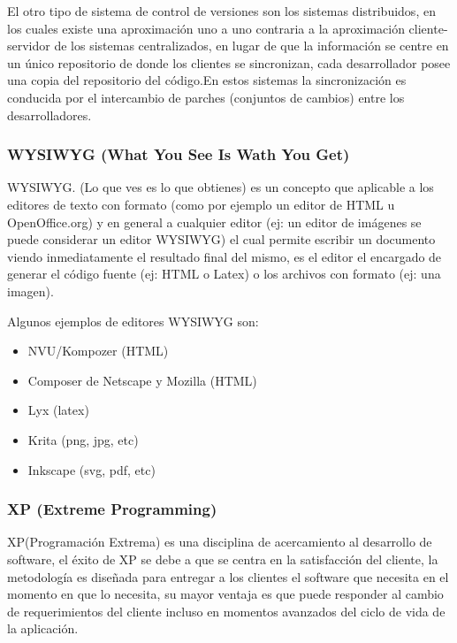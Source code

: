 El otro tipo de sistema de control de versiones son los sistemas distribuidos, en los cuales existe una aproximación uno a uno contraria a la aproximación cliente-servidor de los sistemas centralizados, en lugar de que la información se centre en un único repositorio de donde los clientes se sincronizan, cada desarrollador posee una copia del repositorio del código.\newline En estos sistemas la sincronización es conducida por el intercambio de parches (conjuntos de cambios) entre los desarrolladores.

\subsubsection*{WYSIWYG (What You See Is Wath You Get)}

WYSIWYG. (Lo que ves es lo que obtienes) es un concepto que aplicable a los editores de texto con formato (como por ejemplo un editor de HTML u OpenOffice.org) y en general a cualquier editor (ej: un editor de imágenes se puede considerar un editor WYSIWYG) el cual permite escribir un documento viendo inmediatamente el resultado final del mismo, es el editor el encargado de generar el código fuente (ej: HTML o Latex) o los archivos con formato (ej: una imagen).

Algunos ejemplos de editores WYSIWYG son:

\begin{itemize}

	\item NVU/Kompozer (HTML)
	\item Composer de Netscape y Mozilla (HTML)
	\item Lyx (latex)
	\item Krita (png, jpg, etc)
	\item Inkscape (svg, pdf, etc)

\end{itemize}


\subsubsection*{XP (Extreme Programming) \cite{xp} }

XP(Programación Extrema) es una disciplina de acercamiento al desarrollo de software, el éxito de XP se debe a que se centra en la satisfacción del cliente, la metodología es diseñada para entregar a los clientes el software que necesita en el momento en que lo necesita, su mayor ventaja es que puede responder al cambio de requerimientos del cliente incluso en momentos avanzados del ciclo de vida de la aplicación.

